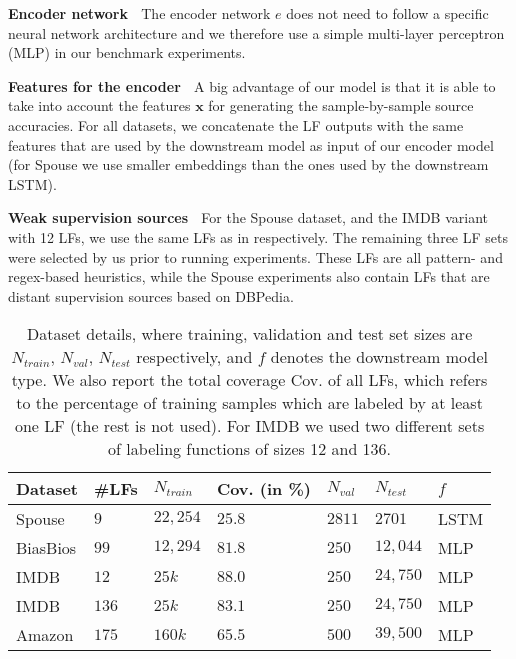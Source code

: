 \documentclass{article}
\newcommand{\features}{\mathbf{x}}
\begin{document}
\textbf{Encoder network} $\;$
The encoder network $e$ does not need to follow a specific neural network architecture and we therefore use a simple multi-layer perceptron (MLP) in our benchmark experiments. 

\textbf{Features for the encoder} $\;$
A big advantage of our model is that it is able to take into account the features $\features$ for generating the sample-by-sample source accuracies. For all datasets, we concatenate the LF outputs with the same features that are used by the downstream model as input of our encoder model (for Spouse we use smaller embeddings than the ones used by the downstream LSTM). 

\textbf{Weak supervision sources} $\;$
For the Spouse dataset, and the IMDB variant with 12 LFs, we use the same LFs as in \cite{triplets, TripletsMean} respectively. The remaining three LF sets were selected by us prior to running experiments.
These LFs are all pattern- and regex-based heuristics, while the Spouse experiments also contain LFs that are distant supervision sources based on DBPedia. 

\begin{table}
\centering
\caption{Dataset details, where training, validation and test set sizes are $N_{train}$, $N_{val}$, $N_{test}$ respectively, and $f$ denotes
the downstream model type. We also report the total coverage Cov. of all LFs, which refers to the percentage of training samples which are labeled by at least one LF (the rest is not used). For IMDB we used two different sets of labeling functions of sizes 12 and 136. }
\begin{tabular}{@{} *7l @{}}
\toprule
    Dataset  & \#LFs & $N_{train}$ & Cov. \small{(in \%)}  & $N_{val}$  & $N_{test}$ & $f$\\ 
    \midrule
    Spouse  & $9$     & $22,254$  & $25.8$ & $2811$ & $2701$    & LSTM \\
    BiasBios & $99$    & $12,294$ & $81.8$ & $250$  & $12,044$  & MLP \\
    IMDB     & $12$    & $25k$    & $88.0$ & $250$  & $24,750$     & MLP \\
    IMDB     & $136$    & $25k$   & $83.1$ & $250$  & $24,750$     & MLP \\
    Amazon   & $175$    & $160k$  & $65.5$    & $500$  & $39,500$     & MLP \\
\bottomrule
\end{tabular}
\label{tab:datasets}
\end{table}
\end{document}
